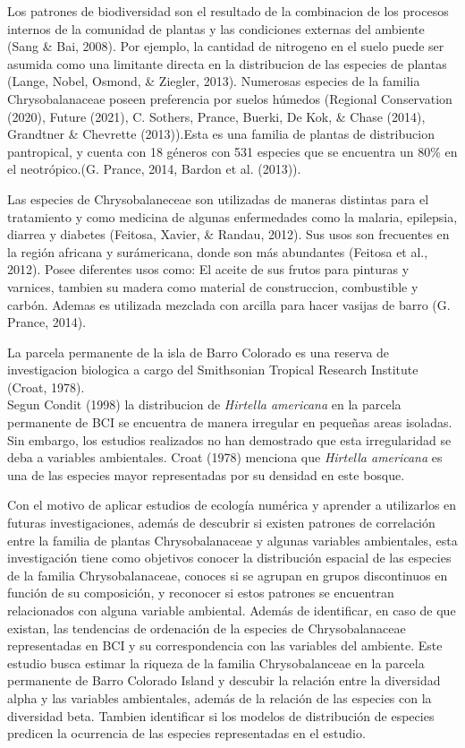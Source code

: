 \documentclass[11pt,]{article}
\begin{document}
Los patrones de biodiversidad son el resultado de la combinacion de los
procesos internos de la comunidad de plantas y las condiciones externas
del ambiente (Sang \& Bai, 2008). Por ejemplo, la cantidad de nitrogeno
en el suelo puede ser asumida como una limitante directa en la
distribucion de las especies de plantas (Lange, Nobel, Osmond, \&
Ziegler, 2013). Numerosas especies de la familia Chrysobalanaceae poseen
preferencia por suelos húmedos (Regional Conservation (2020), Future
(2021), C. Sothers, Prance, Buerki, De Kok, \& Chase (2014), Grandtner
\& Chevrette (2013)).Esta es una familia de plantas de distribucion
pantropical, y cuenta con 18 géneros con 531 especies que se encuentra
un 80\% en el neotrópico.(G. Prance, 2014, Bardon et al. (2013)).

Las especies de Chrysobalaneceae son utilizadas de maneras distintas
para el tratamiento y como medicina de algunas enfermedades como la
malaria, epilepsia, diarrea y diabetes (Feitosa, Xavier, \& Randau,
2012). Sus usos son frecuentes en la región africana y surámericana,
donde son más abundantes (Feitosa et al., 2012). Posee diferentes usos
como: El aceite de sus frutos para pinturas y varnices, tambien su
madera como material de construccion, combustible y carbón. Ademas es
utilizada mezclada con arcilla para hacer vasijas de barro (G. Prance,
2014).

La parcela permanente de la isla de Barro Colorado es una reserva de
investigacion biologica a cargo del Smithsonian Tropical Research
Institute (Croat, 1978).\\
Segun Condit (1998) la distribucion de \emph{Hirtella americana} en la
parcela permanente de BCI se encuentra de manera irregular en pequeñas
areas isoladas. Sin embargo, los estudios realizados no han demostrado
que esta irregularidad se deba a variables ambientales. Croat (1978)
menciona que \emph{Hirtella americana} es una de las especies mayor
representadas por su densidad en este bosque.

Con el motivo de aplicar estudios de ecología numérica y aprender a
utilizarlos en futuras investigaciones, además de descubrir si existen
patrones de correlación entre la familia de plantas Chrysobalanaceae y
algunas variables ambientales, esta investigación tiene como objetivos
conocer la distribución espacial de las especies de la familia
Chrysobalanaceae, conoces si se agrupan en grupos discontinuos en
función de su composición, y reconocer si estos patrones se encuentran
relacionados con alguna variable ambiental. Además de identificar, en
caso de que existan, las tendencias de ordenación de la especies de
Chrysobalanaceae representadas en BCI y su correspondencia con las
variables del ambiente. Este estudio busca estimar la riqueza de la
familia Chrysobalanceae en la parcela permanente de Barro Colorado
Island y descubir la relación entre la diversidad alpha y las variables
ambientales, además de la relación de las especies con la diversidad
beta. Tambien identificar si los modelos de distribución de especies
predicen la ocurrencia de las especies representadas en el estudio.
\end{document}
